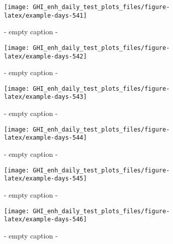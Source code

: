 \documentclass[
  10pt,
  a4paper,oneside]{article}
\begin{document}
\begin{figure}[H]

{\centering \texttt{[image: GHI\_enh\_daily\_test\_plots\_files/figure-latex/example-days-541]} 

}

\caption{ - empty caption - }\label{fig:example-days-541}
\end{figure}

\begin{figure}[H]

{\centering \texttt{[image: GHI\_enh\_daily\_test\_plots\_files/figure-latex/example-days-542]} 

}

\caption{ - empty caption - }\label{fig:example-days-542}
\end{figure}

\begin{figure}[H]

{\centering \texttt{[image: GHI\_enh\_daily\_test\_plots\_files/figure-latex/example-days-543]} 

}

\caption{ - empty caption - }\label{fig:example-days-543}
\end{figure}

\begin{figure}[H]

{\centering \texttt{[image: GHI\_enh\_daily\_test\_plots\_files/figure-latex/example-days-544]} 

}

\caption{ - empty caption - }\label{fig:example-days-544}
\end{figure}

\begin{figure}[H]

{\centering \texttt{[image: GHI\_enh\_daily\_test\_plots\_files/figure-latex/example-days-545]} 

}

\caption{ - empty caption - }\label{fig:example-days-545}
\end{figure}

\begin{figure}[H]

{\centering \texttt{[image: GHI\_enh\_daily\_test\_plots\_files/figure-latex/example-days-546]} 

}

\caption{ - empty caption - }\label{fig:example-days-546}
\end{figure}
\end{document}
